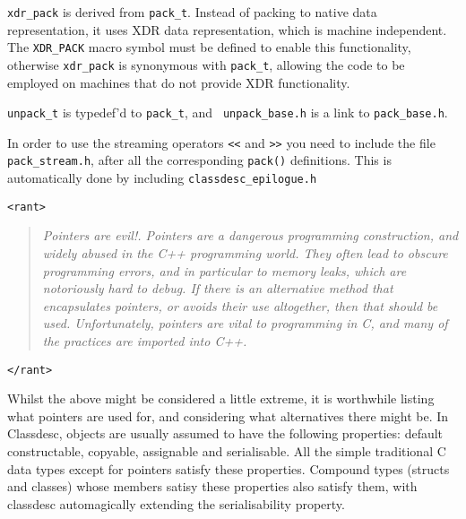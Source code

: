 \verb+xdr_pack+ is derived from \verb+pack_t+.
Instead of packing to native data representation, it uses XDR data
representation, which is machine independent. The
\verb+XDR_PACK+\label{XDR} macro symbol must be defined to
enable this functionality, otherwise \verb+xdr_pack+ is synonymous
with \verb+pack_t+, allowing the code to be employed on machines that
do not provide XDR functionality.

{\tt unpack\_t} is typedef'd to {\tt pack\_t}, and {\tt
  unpack\_base.h} is a link to {\tt pack\_base.h}.

In order to use the streaming operators \verb+<<+ and \verb+>>+ you
need to include the file \verb+pack_stream.h+, after all the
corresponding \verb+pack()+ definitions. This is automatically done by
including \verb+classdesc_epilogue.h+

\label{pointers}

\verb+<rant>+

\begin{quote}{\em
{\em Pointers are evil!}. Pointers are a dangerous
programming construction, and widely abused in the C++ programming
world. They often lead to obscure programming errors, and in
particular to {\em memory leaks}, which are notoriously hard to
debug. If there is an alternative method that encapsulates pointers,
or avoids their use altogether, then that should be
used. Unfortunately, pointers are vital to programming in C, and many
of the practices are imported into C++.
}\end{quote}

\noindent\verb+</rant>+

Whilst the above might be considered a little extreme, it is
worthwhile listing what pointers are used for, and considering what
alternatives there might be. In Classdesc, objects are usually assumed
to have the following properties: default constructable, copyable,
assignable and serialisable. All the simple traditional C data
types except for pointers satisfy these properties. Compound types
(structs and classes) whose members satisy these properties also
satisfy them, with classdesc automagically extending the
serialisability property.

